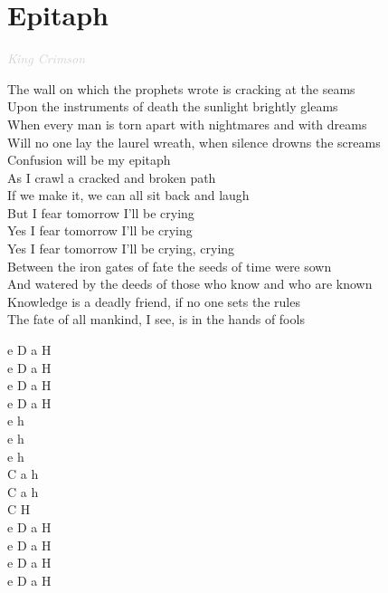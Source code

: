\documentclass[a5paper, 10pt]{book}
\begin{document}
\section{Epitaph}\textcolor{lightgray}{\textit{King Crimson}}\vspace*{2mm}\\
\begin{minipage}[t]{0.83\textwidth}
The wall on which the prophets wrote is cracking at the seams\\
Upon the instruments of death the sunlight brightly gleams\\
When every man is torn apart with nightmares and with dreams\\
Will no one lay the laurel wreath, when silence drowns the screams\\

\hspace*{5mm}Confusion will be my epitaph\\
\hspace*{5mm}As I crawl a cracked and broken path\\
\hspace*{5mm}If we make it, we can all sit back and laugh\\
\hspace*{5mm}But I fear tomorrow I'll be crying\\
\hspace*{5mm}Yes I fear tomorrow I'll be crying\\
\hspace*{5mm}Yes I fear tomorrow I'll be crying, crying\\

Between the iron gates of fate the seeds of time were sown\\
And watered by the deeds of those who know and who are known\\
Knowledge is a deadly friend, if no one sets the rules\\
The fate of all mankind, I see, is in the hands of fools\\
\end{minipage}
\begin{minipage}[t]{0.17\textwidth}
 e D a H\\
 e D a H\\
 e D a H\\
 e D a H\\
 
 e h\\
 e h\\
 e h\\
 C a h\\
 C a h\\
 C H\\

  e D a H\\
 e D a H\\
 e D a H\\
 e D a H\\
\end{minipage}
\end{document}
